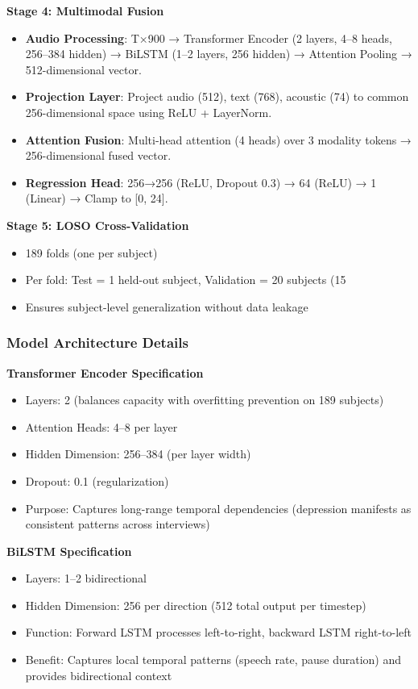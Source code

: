 \documentclass[12pt]{article}
\begin{document}
	\textbf{Stage 4: Multimodal Fusion}
	\begin{itemize}
		\item \textbf{Audio Processing}: T×900 → Transformer Encoder (2 layers, 4--8 heads, 256--384 hidden) → BiLSTM (1--2 layers, 256 hidden) → Attention Pooling → 512-dimensional vector.
		\item \textbf{Projection Layer}: Project audio (512), text (768), acoustic (74) to common 256-dimensional space using ReLU + LayerNorm.
		\item \textbf{Attention Fusion}: Multi-head attention (4 heads) over 3 modality tokens → 256-dimensional fused vector.
		\item \textbf{Regression Head}: 256→256 (ReLU, Dropout 0.3) → 64 (ReLU) → 1 (Linear) → Clamp to [0, 24].
	\end{itemize}

	\textbf{Stage 5: LOSO Cross-Validation}
	\begin{itemize}
		\item 189 folds (one per subject)
		\item Per fold: Test = 1 held-out subject, Validation = 20 subjects (15%
		\item Ensures subject-level generalization without data leakage
	\end{itemize}

	\subsubsection{Model Architecture Details}

	\textbf{Transformer Encoder Specification}
	\begin{itemize}
		\item Layers: 2 (balances capacity with overfitting prevention on 189 subjects)
		\item Attention Heads: 4--8 per layer
		\item Hidden Dimension: 256--384 (per layer width)
		\item Dropout: 0.1 (regularization)
		\item Purpose: Captures long-range temporal dependencies (depression manifests as consistent patterns across interviews)
	\end{itemize}

	\textbf{BiLSTM Specification}
	\begin{itemize}
		\item Layers: 1--2 bidirectional
		\item Hidden Dimension: 256 per direction (512 total output per timestep)
		\item Function: Forward LSTM processes left-to-right, backward LSTM right-to-left
		\item Benefit: Captures local temporal patterns (speech rate, pause duration) and provides bidirectional context
	\end{itemize}
\end{document}
